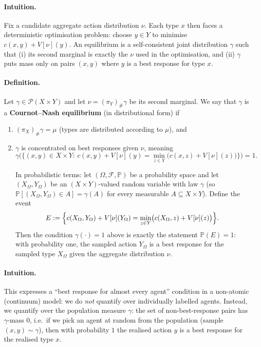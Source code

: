 \paragraph{Intuition.}
Fix a candidate aggregate action distribution $\nu$. Each type $x$ then faces a deterministic optimisation problem:
choose $y\in Y$ to minimise $c(x,y)+V[\nu](y)$. An equilibrium is a self-consistent joint distribution $\gamma$ such that
(i) its second marginal is exactly the $\nu$ used in the optimisation, and (ii) $\gamma$ puts mass only on pairs $(x,y)$
where $y$ is a best response for type $x$.

\paragraph{Definition.}
Let $\gamma\in\mathcal{P}(X\times Y)$ and let $\nu=(\pi_Y)_{\#}\gamma$ be its second marginal.
We say that $\gamma$ is a \textbf{Cournot--Nash equilibrium} (in distributional form) if
\begin{enumerate}[label=(\roman*)]
    \item $(\pi_X)_{\#}\gamma=\mu$ (types are distributed according to $\mu$), and
    \item $\gamma$ is concentrated on best responses given $\nu$, meaning
    $$
    \gamma\bigl(\{(x,y)\in X\times Y:\ c(x,y)+V[\nu](y)=\min_{z\in Y}\bigl(c(x,z)+V[\nu](z)\bigr)\}\bigr)=1.
    $$

    In probabilistic terms: let $(\Omega,\mathcal{F},\mathbb{P})$ be a probability space and let $(X_{\Omega},Y_{\Omega})$
    be an $(X\times Y)$-valued random variable with law $\gamma$ (so $\mathbb{P}[(X_{\Omega},Y_{\Omega})\in A]=\gamma(A)$ for
    every measurable $A\subseteq X\times Y$). Define the event
    $$
    E := \Bigl\{c(X_{\Omega},Y_{\Omega})+V[\nu](Y_{\Omega})=\min_{z\in Y}\bigl(c(X_{\Omega},z)+V[\nu](z)\bigr)\Bigr\}.
    $$
    Then the condition $\gamma(\cdot)=1$ above is exactly the statement $\mathbb{P}(E)=1$: with probability one, the sampled
    action $Y_{\Omega}$ is a best response for the sampled type $X_{\Omega}$ given the aggregate distribution $\nu$.

\end{enumerate}


\paragraph{Intuition.}
This expresses a ``best response for almost every agent'' condition in a non-atomic (continuum) model: we do \emph{not}
quantify over individually labelled agents. Instead, we quantify over the population measure $\gamma$: the set of
non-best-response pairs has $\gamma$-mass $0$, i.e.\ if we pick an agent at random from the population (sample
$(x,y)\sim\gamma$), then with probability $1$ the realised action $y$ is a best response for the realised type $x$.

